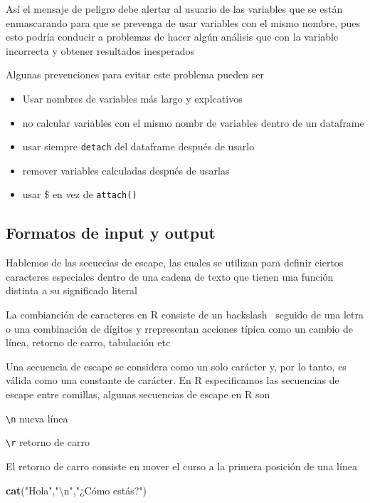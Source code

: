 \documentclass[]{article}
\newenvironment{Shaded}{\begin{snugshade}}{\end{snugshade}}
\newcommand{\KeywordTok}[1]{\textcolor[rgb]{0.13,0.29,0.53}{\textbf{#1}}}
\newcommand{\CharTok}[1]{\textcolor[rgb]{0.31,0.60,0.02}{#1}}
\newcommand{\StringTok}[1]{\textcolor[rgb]{0.31,0.60,0.02}{#1}}
\newcommand{\NormalTok}[1]{#1}
\begin{document}
Así el mensaje de peligro debe alertar al usuario de las variables que
se están enmascarando para que se prevenga de usar variables con el
mismo nombre, pues esto podría conducir a problemas de hacer algún
análisis que con la variable incorrecta y obtener resultados inesperados

Algunas prevenciones para evitar este problema pueden ser

\begin{itemize}
\item
  Usar nombres de variables más largo y explcativos
\item
  no calcular variables con el mismo nombr de variables dentro de un
  dataframe
\item
  usar siempre \texttt{detach} del dataframe después de usarlo
\item
  remover variables calculadas después de usarlas
\item
  usar \$ en vez de \texttt{attach()}
\end{itemize}

\subsection{Formatos de input y
output}\label{formatos-de-input-y-output}

Hablemos de las secuecias de escape, las cuales se utilizan para definir
ciertos caracteres especiales dentro de una cadena de texto que tienen
una función distinta a su significado literal

La combianción de caracteres en R consiste de un backslash ~seguido de
una letra o una combinación de dígitos y rrepresentan acciones típica
como un cambio de línea, retorno de carro, tabulación etc

Una secuencia de escape se considera como un solo carácter y, por lo
tanto, es válida como una constante de carácter. En R especificamos las
secuencias de escape entre comillas, algunas secuencias de escape en R
son

\texttt{\textbackslash{}n} nueva línea

\texttt{\textbackslash{}r} retorno de carro

El retorno de carro consiste en mover el curso a la primera posición de
una línea

\begin{Shaded}
\begin{Highlighting}[]
\KeywordTok{cat}\NormalTok{(}\StringTok{"Hola"}\NormalTok{,}\StringTok{"}\CharTok{\textbackslash{}n}\StringTok{"}\NormalTok{,}\StringTok{"¿Cómo estás?"}\NormalTok{)}
\end{Highlighting}
\end{Shaded}
\end{document}

